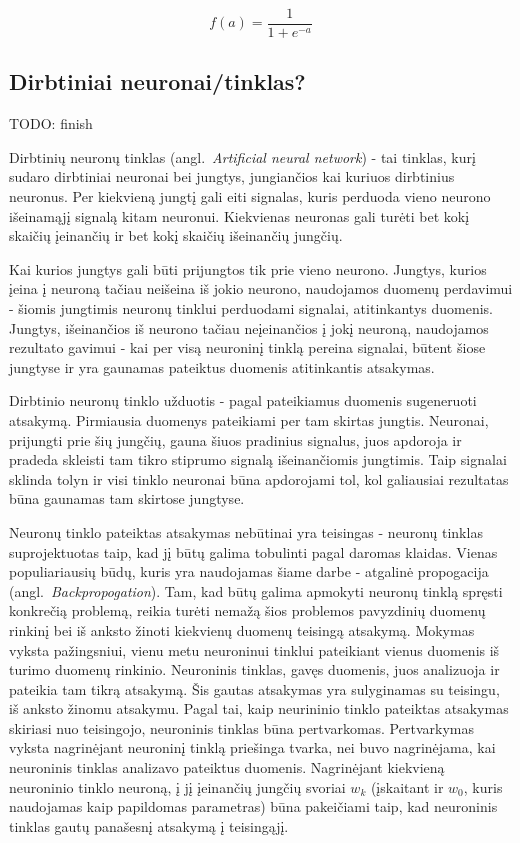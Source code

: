\documentclass{VUMIFPSbakalaurinis}
\newcommand{\TODO}[1]{
\colorbox{todo-background-color}{TODO: #1}
}
\begin{document}
\begin{equation} \label{eq:sigmoid}
f(a) = \frac{1}{1 + e^{-a}}
\end{equation}



\subsection{Dirbtiniai neuronai/tinklas?}

\TODO{finish}

Dirbtinių neuronų tinklas (angl.~\textit{Artificial neural network}) - tai tinklas, kurį sudaro dirbtiniai neuronai bei jungtys, jungiančios kai kuriuos dirbtinius neuronus.
Per kiekvieną jungtį gali eiti signalas, kuris perduoda vieno neurono išeinamąjį signalą kitam neuronui.
Kiekvienas neuronas gali turėti bet kokį skaičių įeinančių ir bet kokį skaičių išeinančių jungčių.

Kai kurios jungtys gali būti prijungtos tik prie vieno neurono.
Jungtys, kurios įeina į neuroną tačiau neišeina iš jokio neurono, naudojamos duomenų perdavimui - šiomis jungtimis neuronų tinklui perduodami signalai, atitinkantys duomenis.
Jungtys, išeinančios iš neurono tačiau neįeinančios į jokį neuroną, naudojamos rezultato gavimui - kai per visą neuroninį tinklą pereina signalai, būtent šiose jungtyse ir yra gaunamas pateiktus duomenis atitinkantis atsakymas.

Dirbtinio neuronų tinklo užduotis - pagal pateikiamus duomenis sugeneruoti atsakymą.
Pirmiausia duomenys pateikiami per tam skirtas jungtis.
Neuronai, prijungti prie šių jungčių, gauna šiuos pradinius signalus, juos apdoroja ir pradeda skleisti tam tikro stiprumo signalą išeinančiomis jungtimis.
Taip signalai sklinda tolyn ir visi tinklo neuronai būna apdorojami tol, kol galiausiai rezultatas būna gaunamas tam skirtose jungtyse.


Neuronų tinklo pateiktas atsakymas nebūtinai yra teisingas - neuronų tinklas suprojektuotas taip, kad jį būtų galima tobulinti pagal daromas klaidas.
Vienas populiariausių būdų, kuris yra naudojamas šiame darbe - atgalinė propogacija (angl.~\textit{Backpropogation}).
Tam, kad būtų galima apmokyti neuronų tinklą spręsti konkrečią problemą, reikia turėti nemažą šios problemos pavyzdinių duomenų rinkinį bei iš anksto žinoti kiekvienų duomenų teisingą atsakymą.
Mokymas vyksta pažingsniui, vienu metu neuroninui tinklui pateikiant vienus duomenis iš turimo duomenų rinkinio.
Neuroninis tinklas, gavęs duomenis, juos analizuoja ir pateikia tam tikrą atsakymą.
Šis gautas atsakymas yra sulyginamas su teisingu, iš anksto žinomu atsakymu.
Pagal tai, kaip neurininio tinklo pateiktas atsakymas skiriasi nuo teisingojo, neuroninis tinklas būna pertvarkomas.
Pertvarkymas vyksta nagrinėjant neuroninį tinklą priešinga tvarka, nei buvo nagrinėjama, kai neuroninis tinklas analizavo pateiktus duomenis.
Nagrinėjant kiekvieną neuroninio tinklo neuroną, į jį įeinančių jungčių svoriai $w_k$ (įskaitant ir $w_0$, kuris naudojamas kaip papildomas parametras) būna pakeičiami taip, kad neuroninis tinklas gautų panašesnį atsakymą į teisingąjį.
\end{document}
